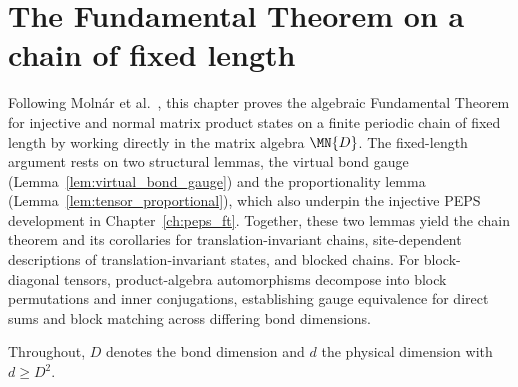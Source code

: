 
\chapter{The Fundamental Theorem on a chain of fixed length}%
\label{ch:algebraic_ft}

Following Moln\'ar et al.~\cite{Molnar2018NormalPEPS}, this chapter proves the
algebraic Fundamental Theorem for injective and normal matrix product states on
a finite periodic chain of fixed length by working directly in the matrix
algebra $\MN{D}$.
The fixed-length argument rests on two structural lemmas, the virtual bond
gauge (Lemma~\ref{lem:virtual_bond_gauge}) and the proportionality lemma
(Lemma~\ref{lem:tensor_proportional}), which also underpin the injective PEPS
development in Chapter~\ref{ch:peps_ft}.
Together, these two lemmas yield the chain theorem and its corollaries for
translation-invariant chains, site-dependent descriptions of
translation-invariant states, and blocked chains.
For block-diagonal tensors, product-algebra automorphisms decompose into block
permutations and inner conjugations, establishing gauge equivalence for direct
sums and block matching across differing bond dimensions.

Throughout, $D$ denotes the bond dimension and $d$ the physical dimension
with $d \ge D^2$.






